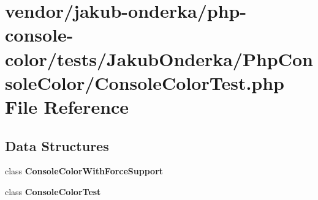 \section{vendor/jakub-\/onderka/php-\/console-\/color/tests/\+Jakub\+Onderka/\+Php\+Console\+Color/\+Console\+Color\+Test.php File Reference}
\label{_console_color_test_8php}
\subsection*{Data Structures}
\begin{DoxyCompactItemize}
\item 
class {\bf Console\+Color\+With\+Force\+Support}
\item 
class {\bf Console\+Color\+Test}
\end{DoxyCompactItemize}
